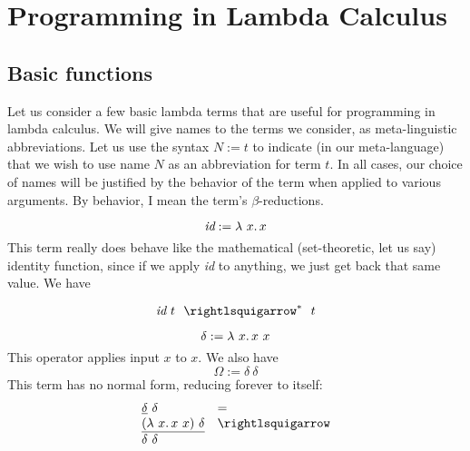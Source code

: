 \chapter{Programming in Lambda Calculus}
\label{ch:prog}

\section{Basic functions}
\label{sec:basicfuncs}

Let us consider a few basic lambda terms that are useful for
programming in lambda calculus.  We will give names to the terms we
consider, as meta-linguistic abbreviations.  Let us use the syntax $N
:= t$ to indicate (in our meta-language) that we wish to use name $N$
as an abbreviation for term $t$.  In all cases, our choice of names
will be justified by the behavior of the term when applied to various
arguments.  By behavior, I mean the term's $\beta$-reductions.

\[
\textit{id} := \lambda\ x.\, x
\]
\noindent This term really does behave like the mathematical
(set-theoretic, let us say) identity function, since if we apply
\textit{id} to anything, we just get back that same value.  We have

\[
\textit{id}\ t \ \ \betaa^* \ \ t
\]

\[
\delta := \lambda\ x.\, x\ x
\]
\noindent This operator applies input $x$ to $x$. 
We also have
\[
\Omega := \delta\ \delta
\]
\noindent This term has no normal form, reducing forever to itself:\index{$\Omega$}
\[
\begin{array}{ll}
  \underline{\delta}\ \delta & = \\
  \underline{(\lam{x}{x\ x})\ \delta} & \betaa \\
  \delta\ \delta &\
\end{array}
\]

